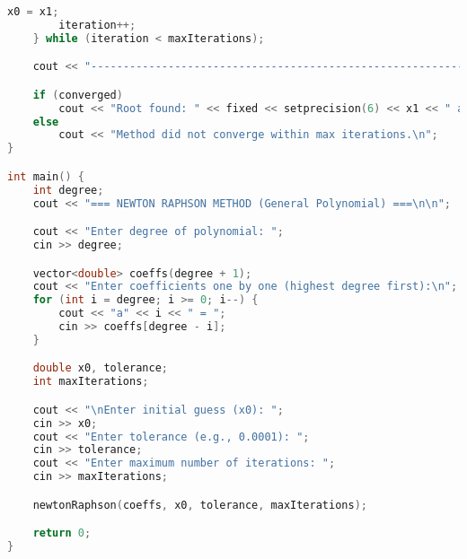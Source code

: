 \documentclass[12pt,a4paper]{article}
\begin{document}
\begin{lstlisting}[language=C++, caption={Newton-Raphson Method for General Polynomials}, label={lst:newtonraphson}]
        x0 = x1;
        iteration++;
    } while (iteration < maxIterations);

    cout << "-----------------------------------------------------------------------------------------\n";

    if (converged)
        cout << "Root found: " << fixed << setprecision(6) << x1 << " after " << iteration + 1 << " iterations.\n";
    else
        cout << "Method did not converge within max iterations.\n";
}

int main() {
    int degree;
    cout << "=== NEWTON RAPHSON METHOD (General Polynomial) ===\n\n";

    cout << "Enter degree of polynomial: ";
    cin >> degree;

    vector<double> coeffs(degree + 1);
    cout << "Enter coefficients one by one (highest degree first):\n";
    for (int i = degree; i >= 0; i--) {
        cout << "a" << i << " = ";
        cin >> coeffs[degree - i];
    }

    double x0, tolerance;
    int maxIterations;

    cout << "\nEnter initial guess (x0): ";
    cin >> x0;
    cout << "Enter tolerance (e.g., 0.0001): ";
    cin >> tolerance;
    cout << "Enter maximum number of iterations: ";
    cin >> maxIterations;

    newtonRaphson(coeffs, x0, tolerance, maxIterations);

    return 0;
}
\end{lstlisting}
\end{document}
